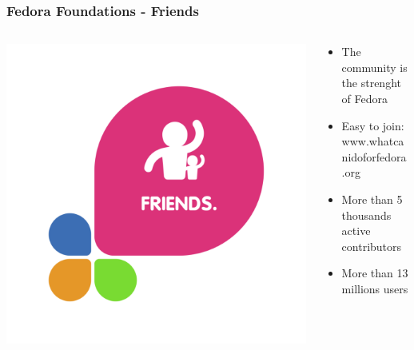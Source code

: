 \documentclass[t,aspectratio=169]{beamer}
\begin{document}
\begin{frame}
    \frametitle{Fedora Foundations - Friends}
    \begin{columns}[T] %
        \begin{column}{.5\textwidth}
            \includegraphics[width=\linewidth]{foundations_expand_2_friends.png}
        \end{column}
        \begin{column}{.5\textwidth}
            \begin{itemize}
                \item<2-> The community is the strenght of Fedora
                \item<3-> Easy to join: www.whatcanidoforfedora.org
                \item<4-> More than 5 thousands active contributors
                \item<5-> More than 13 millions users
            \end{itemize}
        \end{column}
    \end{columns}
\end{frame}
\end{document}
